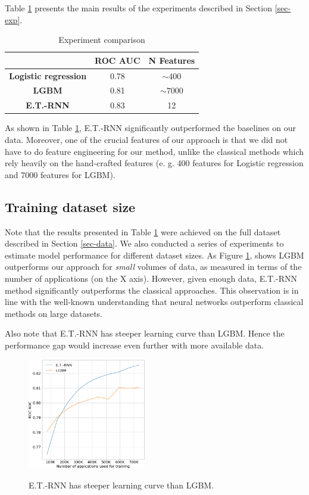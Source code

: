 \documentclass[sigconf]{acmart}
\begin{document}
Table \ref{tab-res} presents the main results of the experiments described in Section \ref{sec-exp}.

\begin{table}[ht]
\caption{Experiment comparison}
\begin{tabular}{ | c | c | c | }
\hline
& \textbf{ROC AUC} & \textbf{N Features} \\
\hline
\textbf{Logistic regression} & 0.78 & $\sim400$ \\
\textbf{LGBM} & 0.81 & $\sim7000$ \\
\textbf{E.T.-RNN} & 0.83 & 12 \\
\hline
\end{tabular}
\label{tab-res}
\end{table}

As shown in Table \ref{tab-res}, E.T.-RNN significantly outperformed the baselines on our data. Moreover, one of the crucial features of our approach is that we did not have to do feature engineering for our method, unlike the classical methods which rely heavily on the hand-crafted features (e. g. 400 features for Logistic regression and 7000 features for LGBM).

\subsection{Training dataset size}

Note that the results presented in Table \ref{tab-res} were achieved on the full dataset described in Section \ref{sec-data}. We also conducted a series of experiments to estimate model performance for different dataset sizes.
As Figure \ref{fig-lc}, shows LGBM outperforms our approach for \textit{small} volumes of data, as measured in terms of the number of applications (on the X axis). However, given enough data, E.T.-RNN method significantly outperforms the classical approaches. This observation is in line with the well-known understanding that neural networks outperform classical methods on large datasets.

Also note that E.T.-RNN has steeper learning curve than LGBM. Hence the performance gap would increase even further with more available data.

\begin{figure}[ht]
  \caption{E.T.-RNN has steeper learning curve than LGBM.}
  \includegraphics[width=0.46\textwidth]{figures/learning-curve.png}
  \label{fig-lc}
\end{figure}
\end{document}
